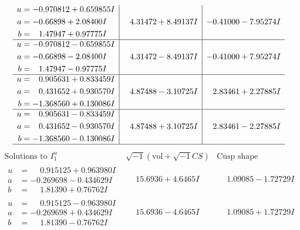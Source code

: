 \documentclass[1p]{elsarticle_modified}
\theoremstyle{definition}
\newcommand{\I}{\sqrt{-1}}
\begin{document}
$$\begin{array}{c|c|c}
\begin{aligned}
u &= -0.970812 + 0.659855 I \\
a &= -0.66898 + 2.08400 I \\
b &= \phantom{-}1.47947 + 0.97775 I\end{aligned}
 & \phantom{-}4.31472 + 8.49137 I & -0.41000 - 7.95274 I \\ \hline\begin{aligned}
u &= -0.970812 - 0.659855 I \\
a &= -0.66898 - 2.08400 I \\
b &= \phantom{-}1.47947 - 0.97775 I\end{aligned}
 & \phantom{-}4.31472 - 8.49137 I & -0.41000 + 7.95274 I \\ \hline\begin{aligned}
u &= \phantom{-}0.905631 + 0.833459 I \\
a &= \phantom{-}0.431652 + 0.930570 I \\
b &= -1.368560 + 0.130086 I\end{aligned}
 & \phantom{-}4.87488 - 3.10725 I & \phantom{-}2.83461 + 2.27885 I \\ \hline\begin{aligned}
u &= \phantom{-}0.905631 - 0.833459 I \\
a &= \phantom{-}0.431652 - 0.930570 I \\
b &= -1.368560 - 0.130086 I\end{aligned}
 & \phantom{-}4.87488 + 3.10725 I & \phantom{-}2.83461 - 2.27885 I\\
 \hline 
 \end{array}$$\newpage$$\begin{array}{c|c|c}  
\text{Solutions to }I^u_{1}& \I (\text{vol} + \sqrt{-1}CS) & \text{Cusp shape}\\
 \hline 
\begin{aligned}
u &= \phantom{-}0.915125 + 0.963980 I \\
a &= -0.269698 - 0.434629 I \\
b &= \phantom{-}1.81390 + 0.76762 I\end{aligned}
 & \phantom{-}15.6936 + 4.6465 I & \phantom{-}1.09085 - 1.72729 I \\ \hline\begin{aligned}
u &= \phantom{-}0.915125 - 0.963980 I \\
a &= -0.269698 + 0.434629 I \\
b &= \phantom{-}1.81390 - 0.76762 I\end{aligned}
 & \phantom{-}15.6936 - 4.6465 I & \phantom{-}1.09085 + 1.72729 I \\ \hline\begin{aligned}

\end{aligned}
\end{array}$$
\end{document}
